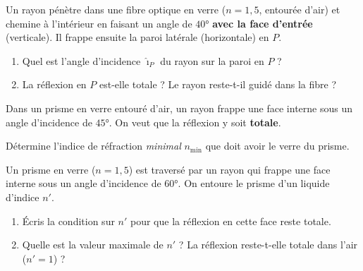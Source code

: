 \documentclass[11pt,a4paper]{article}
\begin{document}
\begin{exo}
Un rayon pénètre dans une fibre optique en verre ($n=1{,}5$, entourée d'air) et chemine à
l'intérieur en faisant un angle de $\ang{40}$ \textbf{avec la face d'entrée} (verticale). Il frappe
ensuite la paroi latérale (horizontale) en $P$.
\begin{center}
\end{center}
\begin{enumerate}[label=\alph*)]
  \item Quel est l'angle d'incidence $\hat{\imath}_P$ du rayon sur la paroi en $P$ ?
  \item La réflexion en $P$ est-elle totale ? Le rayon reste-t-il guidé dans la fibre ?
\end{enumerate}
\end{exo}

\begin{exo}
Dans un prisme en verre entouré d'air, un rayon frappe une face interne sous un angle d'incidence de
$\ang{45}$. On veut que la réflexion y soit \textbf{totale}.

Détermine l'indice de réfraction \emph{minimal} $n_{\min}$ que doit avoir le verre du prisme.
\end{exo}

\begin{exo}
Un prisme en verre ($n=1{,}5$) est traversé par un rayon qui frappe une face interne sous un angle
d'incidence de $\ang{60}$. On entoure le prisme d'un liquide d'indice $n'$.
\begin{enumerate}[label=\alph*)]
  \item Écris la condition sur $n'$ pour que la réflexion en cette face reste totale.
  \item Quelle est la valeur maximale de $n'$ ? La réflexion reste-t-elle totale dans l'air
        ($n'=1$) ?
\end{enumerate}
\end{exo}
\end{document}
